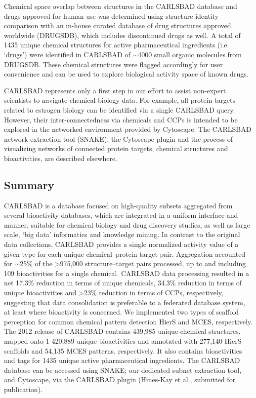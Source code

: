 Chemical space overlap between structures in the CARLSBAD database and drugs approved for human use was determined using structure identity comparison with an in-house curated database of drug structures approved worldwide (DRUGSDB), which includes discontinued drugs as well\cite{Oprea2010-kd,Manallack2013-qm}. A total of 1435 unique chemical structures for active pharmaceutical ingredients (i.e. ‘drugs’) were identified in CARLSBAD of $\sim$4000 small organic molecules from DRUGSDB. These chemical structures were flagged accordingly for user convenience and can be used to explore biological activity space of known drugs.

CARLSBAD represents only a first step in our effort to assist non-expert scientists to navigate chemical biology data. For example, all protein targets related to estrogen biology can be identified via a single CARLSBAD query. However, their inter-connectedness via chemicals and CCPs is intended to be explored in the networked environment provided by Cytoscape\cite{Shannon2003-ph}. The CARLSBAD network extraction tool (SNAKE), the Cytoscape plugin and the process of visualizing networks of connected protein targets, chemical structures and bioactivities, are described elsewhere.

\subsection{Summary}

CARLSBAD is a database focused on high-quality subsets aggregated from several bioactivity databases, which are integrated in a uniform interface and manner, suitable for chemical biology and drug discovery studies, as well as large scale, ‘big data’ informatics and knowledge mining. In contrast to the original data collections, CARLSBAD provides a single normalized activity value of a given type for each unique chemical–protein target pair. Aggregation accounted for $\sim$25\% of the \textgreater 975,000 structure–target pairs processed, up to and including 109 bioactivities for a single chemical. CARLSBAD data processing resulted in a net 17.3\% reduction in terms of unique chemicals, 34.3\% reduction in terms of unique bioactivities and \textgreater 23\% reduction in terms of CCPs, respectively, suggesting that data consolidation is preferable to a federated database system, at least where bioactivity is concerned. We implemented two types of scaffold perception for common chemical pattern detection HierS and MCES, respectively. The 2012 release of CARLSBAD contains 439,985 unique chemical structures, mapped onto 1 420,889 unique bioactivities and annotated with 277,140 HierS scaffolds and 54,135 MCES patterns, respectively. It also contains bioactivities and tags for 1435 unique active pharmaceutical ingredients. The CARLSBAD database can be accessed using SNAKE; our dedicated subnet extraction tool, and Cytoscape, via the CARLSBAD plugin (Hines-Kay et al., submitted for publication).




